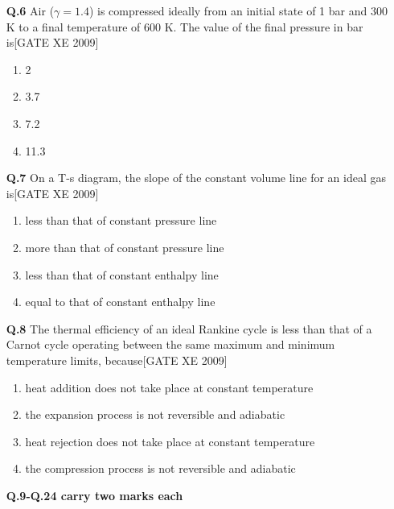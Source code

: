 \documentclass[journal,12pt,onecolumn]{IEEEtran}
\theoremstyle{remark}
\begin{document}
\begin{enumerate}
\vspace{0.3cm}

\item[\textbf{Q.6}]  Air ($\gamma=1.4$) is compressed ideally from an initial state of 1 bar and 300 K to a final temperature of 600 K. The value of the final pressure in bar is\hfill[GATE XE 2009]
\begin{multicols}{2}
\begin{enumerate}
    \item 2
    \item 3.7
    \item 7.2
    \item 11.3
\end{enumerate}
\end{multicols}

\vspace{0.3cm}

\item[\textbf{Q.7}]  On a T-s diagram, the slope of the constant volume line for an ideal gas is\hfill[GATE XE 2009]
\begin{multicols}{2}
\begin{enumerate}
    \item less than that of constant pressure line
    \item more than that of constant pressure line
    \item less than that of constant enthalpy line
    \item equal to that of constant enthalpy line
\end{enumerate}
\end{multicols}

\vspace{0.3cm}

\item[\textbf{Q.8}]  The thermal efficiency of an ideal Rankine cycle is less than that of a Carnot cycle operating between the same maximum and minimum temperature limits, because\hfill[GATE XE 2009]
\begin{multicols}{2}
\begin{enumerate}
    \item heat addition does not take place at constant temperature
    \item the expansion process is not reversible and adiabatic
    \item heat rejection does not take place at constant temperature
    \item the compression process is not reversible and adiabatic
\end{enumerate}
\end{multicols}
\textbf{Q.9-Q.24 carry two marks each}
\setcounter{enumi}{8} %


\end{enumerate}
\end{document}
